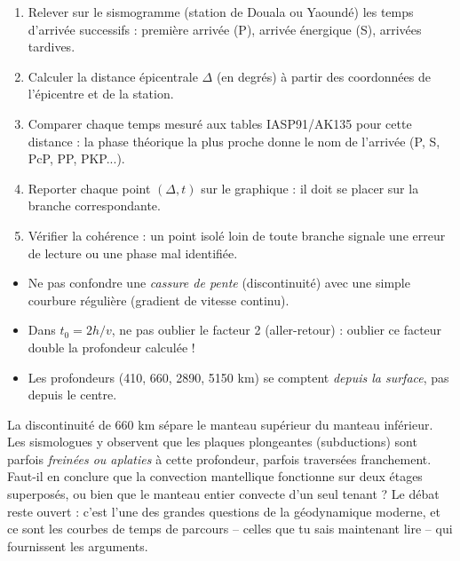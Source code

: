\documentclass[11pt]{article}
\begin{document}
\begin{methode}
\begin{enumerate}
\item Relever sur le sismogramme (station de Douala ou Yaoundé) les temps d'arrivée successifs : première arrivée (P), arrivée énergique (S), arrivées tardives.
\item Calculer la distance épicentrale $\Delta$ (en degrés) à partir des coordonnées de l'épicentre et de la station.
\item Comparer chaque temps mesuré aux tables IASP91/AK135 pour cette distance : la phase théorique la plus proche donne le nom de l'arrivée (P, S, PcP, PP, PKP...).
\item Reporter chaque point $(\Delta, t)$ sur le graphique : il doit se placer sur la branche correspondante.
\item Vérifier la cohérence : un point isolé loin de toute branche signale une erreur de lecture ou une phase mal identifiée.
\end{enumerate}
\end{methode}

\begin{attention}
\begin{itemize}
\item Ne pas confondre une \emph{cassure de pente} (discontinuité) avec une simple courbure régulière (gradient de vitesse continu).
\item Dans $t_0 = 2h/v$, ne pas oublier le facteur 2 (aller-retour) : oublier ce facteur double la profondeur calculée !
\item Les profondeurs (410, 660, \num{2890}, \num{5150} km) se comptent \emph{depuis la surface}, pas depuis le centre.
\end{itemize}
\end{attention}

\begin{savaistu}
La discontinuité de 660 km sépare le manteau supérieur du manteau inférieur. Les sismologues y observent que les plaques plongeantes (subductions) sont parfois \emph{freinées ou aplaties} à cette profondeur, parfois traversées franchement. Faut-il en conclure que la convection mantellique fonctionne sur deux étages superposés, ou bien que le manteau entier convecte d'un seul tenant ? Le débat reste ouvert : c'est l'une des grandes questions de la géodynamique moderne, et ce sont les courbes de temps de parcours -- celles que tu sais maintenant lire -- qui fournissent les arguments.
\end{savaistu}
\end{document}
